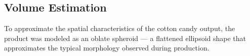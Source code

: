 
\subsection{Volume Estimation}

To approximate the spatial characteristics of the cotton candy output, the product was modeled as an oblate spheroid — a flattened ellipsoid shape that approximates the typical morphology observed during production.

